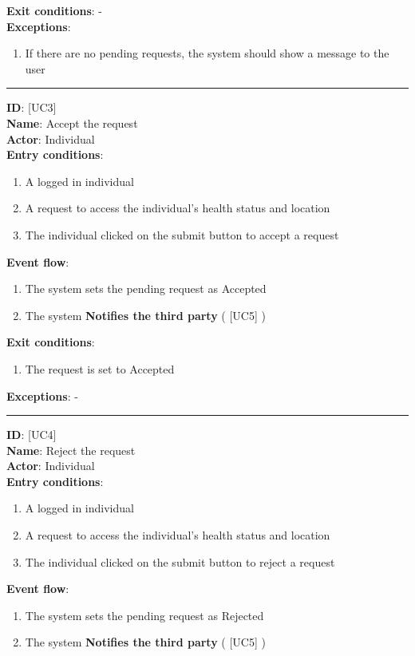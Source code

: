 \documentclass[a4paper, hidelinks, 12pt]{report}
\newcommand\usecase[1]{ [UC#1] }
\begin{document}
\begin{itemize}
		\textbf{Exit conditions}: - \\
		\textbf{Exceptions}:
		\begin{enumerate}
			\item{If there are no pending requests, the system should show a message to the user}
		\end{enumerate}
		\rule{\linewidth}{0.4pt}
		\textbf{ID}: \usecase{3} \\
		\textbf{Name}: Accept the request \\
		\textbf{Actor}: Individual \\
		\textbf{Entry conditions}:
		\begin{enumerate}
			\item{A logged in individual}
			\item{A request to access the individual's health status and location}
			\item{The individual clicked on the submit button to accept a request}
		\end{enumerate}
		\textbf{Event flow}:
		\begin{enumerate}
			\item{The system sets the pending request as Accepted}
			\item{The system \textbf{Notifies the third party} (\usecase{5})}
		\end{enumerate}
		\textbf{Exit conditions}:
		\begin{enumerate}
			\item{The request is set to Accepted}
		\end{enumerate}
		\textbf{Exceptions}: - \\
		\rule{\linewidth}{0.4pt}
		\textbf{ID}: \usecase{4} \\
		\textbf{Name}: Reject the request \\
		\textbf{Actor}: Individual \\
		\textbf{Entry conditions}:
		\begin{enumerate}
			\item{A logged in individual}
			\item{A request to access the individual's health status and location}
			\item{The individual clicked on the submit button to reject a request}
		\end{enumerate}
		\textbf{Event flow}:
		\begin{enumerate}
			\item{The system sets the pending request as Rejected}
			\item{The system \textbf{Notifies the third party} (\usecase{5})}

\end{enumerate}
\end{itemize}
\end{document}
